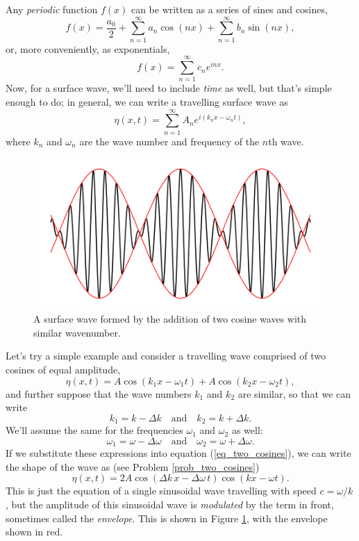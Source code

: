 Any \emph{periodic} function $f(x)$ can be written as a series of sines and cosines,
\[
f(x) = \frac{a_0}{2} + \sum_{n=1}^{\infty} a_n \cos(nx) +  \sum_{n=1}^{\infty} b_n \sin(nx),
\]
or, more conveniently, as exponentials,
\begin{equation}
\label{eq_fourier_series}
f(x) = \sum_{n=1}^\infty c_n e^{inx}.
\end{equation}
Now, for a surface wave, we'll need to include \emph{time} as well, but that's simple enough to do; in general, we can write a travelling surface wave as
\begin{equation}
\label{eq_fourier_waves}
\eta(x, t) = \sum_{n=1}^\infty A_n e^{i(k_n x - \omega_n t)},
\end{equation}
where $k_n$ and $\omega_n$ are the wave number and frequency of the $n$th wave.

\begin{figure}
\centering\includegraphics[width=0.8\linewidth]{Figures/Chapter5/fig_two_cosines}
\caption{A surface wave formed by the addition of two cosine waves with similar wavenumber.}
\label{fig_two_cosines}
\end{figure}

\begin{example}
\label{ex_two_cos}
Let's try a simple example and consider a travelling wave comprised of two cosines of equal amplitude,
\begin{equation}
\label{eq_two_cosines}
\eta(x, t) = A \cos(k_1 x - \omega_1 t) + A \cos(k_2 x - \omega_2 t),
\end{equation}
and further suppose that the wave numbers $k_1$ and $k_2$ are similar, so that we can write
\[
k_1 = k - \Delta k \quad \text{and} \quad k_2 = k + \Delta k.
\]
We'll assume the same for the frequencies $\omega_1$ and $\omega_2$ as well:
\[
\omega_1 = \omega - \Delta \omega \quad \text{and} \quad \omega_2 = \omega + \Delta \omega.
\]
If we substitute these expressions into equation (\ref{eq_two_cosines}), we can write the shape of the wave as (see Problem \ref{prob_two_cosines})
\begin{equation}
\label{eq_two_cosines_ans}
\eta(x, t) = 2A \cos(\Delta k \, x - \Delta \omega \, t) \cos(kx - \omega t).
\end{equation}
This is just the equation of a single sinusoidal wave travelling with speed $c = \omega/k$, but the amplitude of this sinusoidal wave is \emph{modulated} by the term in front, sometimes called the \emph{envelope}.  This is shown in Figure \ref{fig_two_cosines}, with the envelope shown in red.
\end{example}



